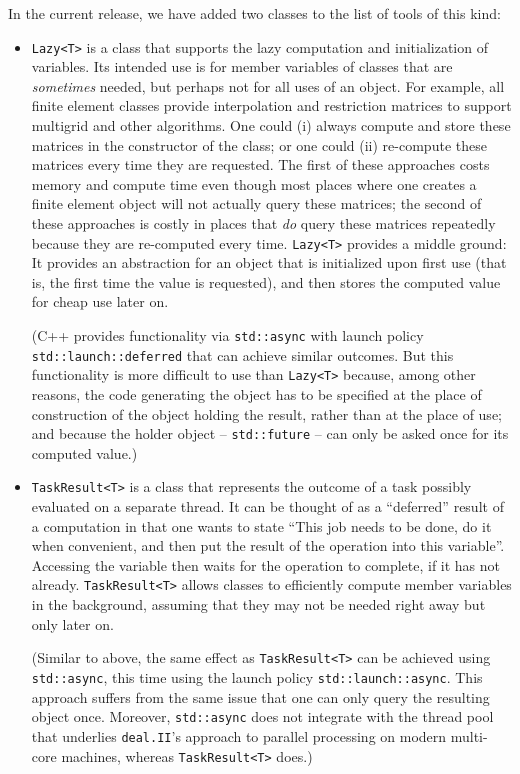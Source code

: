 \documentclass{ansarticle-preprint}
\newcommand{\specialword}[1]{\texttt{#1}}
\newcommand{\dealii}{{\specialword{deal.II}}\xspace}
\begin{document}
In the current release, we have added two classes to the list of tools
of this kind:
\begin{itemize}
  \item
  \texttt{Lazy<T>} is a class that supports the lazy computation and
  initialization of variables. Its intended use is for member
  variables of classes that are \textit{sometimes} needed, but perhaps
  not for all uses of an object. For example, all finite element classes
  provide interpolation and restriction matrices to support multigrid
  and other algorithms. One could (i) always compute and store these
  matrices in the constructor of the class; or one could (ii) re-compute these
  matrices every time they are requested. The first of these
  approaches costs memory and compute time even though most places
  where one creates a finite element object will not actually query
  these matrices; the second of these approaches is costly in places
  that \textit{do} query these matrices repeatedly because they are re-computed
  every time. \texttt{Lazy<T>} provides a middle ground: It provides an
  abstraction for an object that is initialized upon first use (that
  is, the first time the value is requested), and then stores the
  computed value for cheap use later on.

  (C++ provides functionality via \texttt{std::async} with
  launch policy \texttt{std::launch::deferred} that can achieve
  similar outcomes. But this functionality is more difficult to use than
  \texttt{Lazy<T>} because, among other reasons, the code generating the
  object has to be specified at the place of construction of the
  object holding the result, rather than at the place of use; and
  because the holder object -- \texttt{std::future} -- can only be
  asked once for its computed value.)

  \item \texttt{TaskResult<T>} is a class that represents the outcome
    of a task possibly evaluated on a separate thread. It can be
    thought of as a ``deferred'' result of a computation in that one
    wants to state ``This job needs to be done, do it when convenient,
    and then put the result of the operation into this
    variable''. Accessing the variable then waits for the operation to
    complete, if it has not already. \texttt{TaskResult<T>} allows
    classes to efficiently compute member variables in the background,
    assuming that they may not be needed right away but only later on.

    (Similar to above, the same effect as \texttt{TaskResult<T>} can
    be achieved using \texttt{std::async}, this time using the
    launch policy \texttt{std::launch::async}. This approach suffers
    from the same issue that one can only query the resulting object
    once. Moreover, \texttt{std::async} does not integrate with the
    thread pool that underlies \dealii{}'s approach to parallel
    processing on modern multi-core machines, whereas
    \texttt{TaskResult<T>} does.)
\end{itemize}
\end{document}
